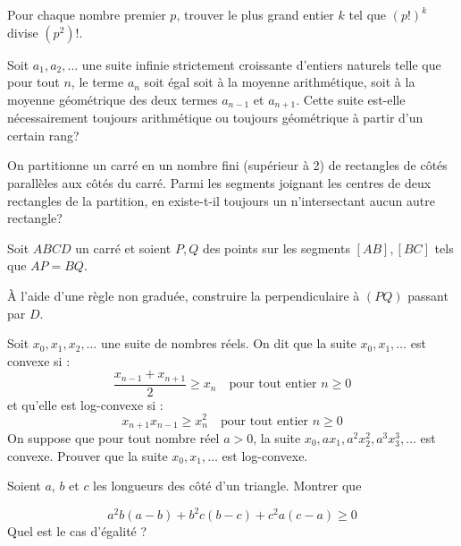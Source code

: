 \begin{exo}{}Pour chaque nombre premier $p$, trouver le plus grand entier $k$ tel que $(p!)^k$ divise $(p^2)!$.
\end{exo}

\begin{exo}{}Soit $a_1,a_2,\ldots$ une suite infinie strictement croissante d'entiers naturels telle que pour tout $n$, le terme $a_n$ soit égal soit à la moyenne arithmétique, soit à la moyenne géométrique des deux termes $a_{n-1}$ et $a_{n+1}$. Cette suite est-elle nécessairement toujours arithmétique ou toujours géométrique à partir d'un certain rang?
\end{exo}

\begin{exo}{}On partitionne un carré en un nombre fini (supérieur à 2) de rectangles de côtés parallèles aux côtés du carré. Parmi les segments joignant les centres de deux rectangles de la partition, en existe-t-il toujours un n'intersectant aucun autre rectangle?
\end{exo}


\begin{exo}{}
Soit $ABCD$ un carré et soient $P,Q$ des points sur les segments $[AB],[BC]$ tels que $AP=BQ$.

\`A l'aide d'une règle non graduée, construire la perpendiculaire à $(PQ)$ passant par $D$.
\end{exo}

\begin{exo}{}
Soit $x_0, x_1, x_2, \ldots $ une suite de nombres réels. On dit que la suite $x_0, x_1, \ldots$ est convexe si :
\[
\frac{x_{n-1}+x_{n+1}}{2}\geq x_n\quad \textrm {pour tout entier } n \geq 0
\]
et qu'elle est log-convexe si :
\[
x_{n+1}x_{n-1}\geq x_n^2\quad \textrm {pour tout entier } n \geq 0
\]
 On suppose que pour tout nombre réel $a>0$, la suite $x_0, a x_1, a^2 x_2^2, a^3 x_3^3, \ldots$ est convexe. Prouver que la suite $x_0, x_1, \ldots $ est log-convexe.
\end{exo}



\begin{exo}{}
Soient $a$, $b$ et $c$ les longueurs
des côté d'un triangle. Montrer que 

\[
a^{2}b\left(a-b\right)+b^{2}c\left(b-c\right)+c^{2}a\left(c-a\right)\geqslant0
\]
Quel est le cas d'égalité ? 
\end{exo}

